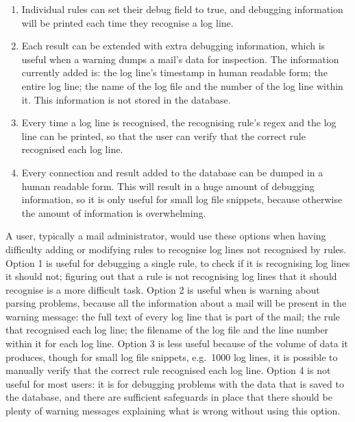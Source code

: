 \begin{enumerate}

    \item Individual rules can set their debug field to true, and debugging
        information will be printed each time they recognise a log line.

    \item Each result can be extended with extra debugging information,
        which is useful when a warning dumps a mail's data for inspection.
        The information currently added is: the log line's timestamp in
        human readable form; the entire log line; the name of the log file
        and the number of the log line within it.  This information is not
        stored in the database.

    \item Every time a log line is recognised, the recognising rule's regex
        and the log line can be printed, so that the user can verify that
        the correct rule recognised each log line.

    \item Every connection and result added to the database can be dumped
        in a human readable form.  This will result in a huge amount of
        debugging information, so it is only useful for small log file
        snippets, because otherwise the amount of information is
        overwhelming.

\end{enumerate}

A user, typically a mail administrator, would use these options when having
difficulty adding or modifying rules to recognise log lines not recognised
by \parsernames{} \numberOFrules{} rules.  Option 1 is useful for debugging
a single rule, to check if it is recognising log lines it should not;
figuring out that a rule is not recognising log lines that it should
recognise is a more difficult task.  Option 2 is useful when \parsername{}
is warning about parsing problems, because all the information about a mail
will be present in the warning message: the full text of every log line
that is part of the mail; the rule that recognised each log line; the
filename of the log file and the line number within it for each log line.
Option 3 is less useful because of the volume of data it produces, though
for small log file snippets, e.g.\ 1000 log lines, it is possible to
manually verify that the correct rule recognised each log line.  Option 4
is not useful for most users: it is for debugging problems with the data
that is saved to the database, and there are sufficient safeguards in place
that there should be plenty of warning messages explaining what is wrong
without using this option.

